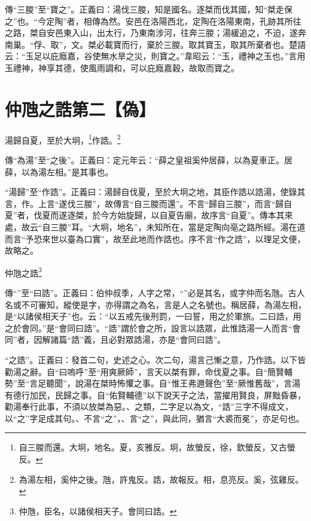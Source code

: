 {\noindent\shu{}\fzkt 傳“三朡”至“寶之”。正義曰：湯伐三朡，知是國名。逐桀而伐其國，知“桀走保之”也。“今定陶”者，相傳為然。安邑在洛陽西北，定陶在洛陽東南，孔跡其所往之路，桀自安邑東入山，出太行，乃東南涉河，往奔三朡；湯緩追之，不迫，遂奔南巢。“俘、取”，文。桀必載寶而行，棄於三朡。取其寶玉，取其所棄者也。楚語云：“玉足以庇廕嘉，谷使無水旱之災，則寶之。”韋昭云：“玉，禮神之玉也。”言用玉禮神，神享其德，使風雨調和，可以庇廕嘉穀，故取而寶之。 \par}

\section{仲虺之誥第二【偽】}

湯歸自夏，至於大坰，\footnote{自三朡而還。大坰，地名。夏，亥雅反。坰，故螢反，徐，欽螢反，又古螢反。}作誥。\footnote{為湯左相，奚仲之後。虺，許鬼反。誥，故報反。相，息亮反。奚，弦雞反。}


{\noindent\zhuan{}\fzbyks 傳“為湯”至“之後”。正義曰：定元年云：“薛之皇祖奚仲居薛，以為夏車正。居薛，以為湯左相。”是其事也。 \par}

{\noindent\shu{}\fzkt “湯歸”至“作誥”。正義曰：湯歸自伐夏，至於大坰之地，其臣作誥以誥湯，使錄其言，作。上言“遂伐三朡”，故傳言“自三朡而還”。不言“歸自三朡”，而言“歸自夏”者，伐夏而遂逐桀，於今方始旋歸，以自夏告廟，故序言“自夏”。傳本其來處，故云“自三朡”耳。“大坰，地名”，未知所在，當是定陶向亳之路所經。湯在道而言“予恐來世以臺為口實”，故至此地而作誥也。序不言“作之誥”，以理足文便，故略之。 \par}

仲虺之誥\footnote{仲虺，臣名，以諸侯相天子。會同曰誥。}


{\noindent\zhuan{}\fzbyks 傳“”至“曰誥”。正義曰：伯仲叔季，人字之常，“”必是其名，或字仲而名虺。古人名或不可審知，縱使是字，亦得謂之為名，言是人之名號也。稱居薛，為湯左相，是“以諸侯相天子”也。云：“以五戒先後刑罰，一曰誓，用之於軍旅。二曰誥，用之於會同。”是“會同曰誥”。“誥”謂於會之所，設言以誥眾，此惟誥湯一人而言“會同”者，因解諸篇“誥”義，且必對眾誥湯，亦是“會同曰誥”。 \par}

{\noindent\shu{}\fzkt “之誥”。正義曰：發首二句，史述之心。次二句，湯言己慚之意，乃作誥。以下皆勸湯之辭。自“曰嗚呼”至“用爽厥師”，言天以桀有罪，命伐夏之事。自“簡賢輔勢”至“言足聽聞”，說湯在桀時怖懼之事。自“惟王弗邇聲色”至“厥惟舊哉”，言湯有德行加民，民歸之事。自“佑賢輔德”以下說天子之法，當擢用賢良，屏黜昏暴，勸湯奉行此事，不須以放桀為惡。、之類，二字足以為文，“誥”三字不得成文，以“之”字足成其句。、不言“之”，、言“之”，與此同，猶言“大裘而冕”，亦足句也。 \par}

